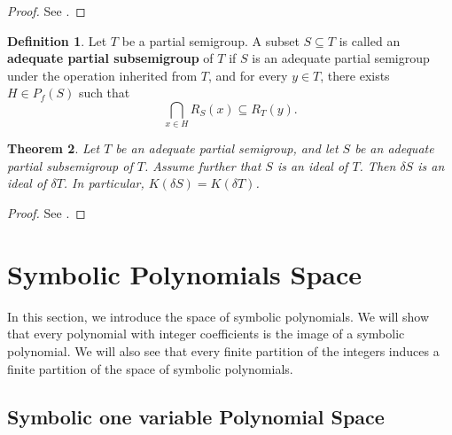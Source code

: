 \documentclass{amsart}
\newtheorem{theorem}{Theorem}[section]
\theoremstyle{definition}
\newtheorem{definition}[theorem]{Definition}
\theoremstyle{remark}
\numberwithin{equation}{section}
\begin{document}
\begin{proof}
	See \cite{McLeod}.
\end{proof}

\begin{definition} \label{1.11}
	Let \( T \) be a partial semigroup. A subset \( S \subseteq T \) is called an \textbf{adequate partial subsemigroup} of \( T \) if \( S \) is an adequate partial semigroup under the operation inherited from \( T \), and for every \( y \in T \), there exists \( H \in P_f(S) \) such that
	\[
	\bigcap_{x \in H} R_S(x) \subseteq R_T(y).
	\]
\end{definition}

\begin{theorem} \label{1.23}
	Let \( T \) be an adequate partial semigroup, and let \( S \) be an adequate partial subsemigroup of \( T \). Assume further that \( S \) is an ideal of \( T \). Then \( \delta S \) is an ideal of \( \delta T \). In particular, \( K(\delta S) = K(\delta T) \).
\end{theorem}
\begin{proof}
	See \cite{McLeod1}.
\end{proof}

\section{\bf Symbolic Polynomials Space}
In this section, we introduce the space of symbolic polynomials. We will show that every polynomial with integer coefficients is the image of a symbolic polynomial. We will also see that every finite partition of the integers induces a finite partition of the space of symbolic polynomials.
\subsection{\bf{Symbolic one variable Polynomial Space}}
\end{document}
